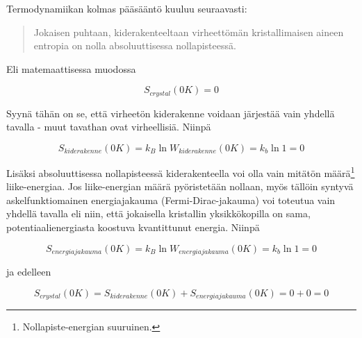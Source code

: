 \documentclass[12pt,a4paper,finnish]{book}
\begin{document}
Termodynamiikan kolmas pääsääntö kuuluu seuraavasti:

\begin{quote}
 Jokaisen puhtaan, kiderakenteeltaan virheettömän kristallimaisen aineen entropia on 
 nolla absoluuttisessa nollapisteessä.
\end{quote}

Eli matemaattisessa muodossa

\begin{equation}
 S_{crystal}(0 K) = 0
\end{equation}

Syynä tähän on se, että virheetön kiderakenne voidaan järjestää vain yhdellä tavalla - muut tavathan 
ovat virheellisiä. Niinpä

\begin{equation}
 S_{kiderakenne}(0K) = k_B \ln W_{kiderakenne}(0K) = k_b \ln 1 = 0
\end{equation}

Lisäksi absoluuttisessa nollapisteessä kiderakenteella voi olla vain mitätön 
määrä\footnote{Nollapiste-energian suuruinen.} liike-energiaa. Jos liike-energian määrä pyöristetään 
nollaan, myös tällöin syntyvä askelfunktiomainen energiajakauma (Fermi-Dirac-jakauma) voi toteutua 
vain yhdellä tavalla eli niin, että jokaisella kristallin yksikkökopilla on sama, potentiaalienergiasta 
koostuva kvantittunut energia. Niinpä

\begin{equation}
 S_{energiajakauma}(0K) = k_B \ln W_{energiajakauma}(0K) = k_b \ln 1 = 0
\end{equation}

ja edelleen

\begin{equation}
 S_{crystal}(0K) = S_{kiderakenne}(0K) + S_{energiajakauma}(0K) = 0 + 0 = 0
\end{equation}

% 
% 
% 
% 
\end{document}
